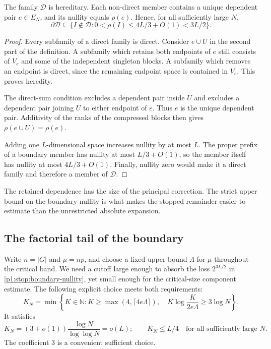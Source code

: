 \begin{lemma}
\label{p1:stop:class}
The family $\mathscr D$ is hereditary.  Each non-direct member
contains a unique dependent pair $e\in E_N$, and its nullity
equals $\rho(e)$.  Hence, for all sufficiently large $N$,
\begin{equation}
 \partial\mathscr D
 \subseteq\{I\notin\mathscr D:
                 0<\rho(I)\le 4L/3+O(1)<3L/2\}.
 \label{p1:stop:boundary-nullity}
\end{equation}
\end{lemma}

\begin{proof}
Every subfamily of a direct family is direct.
Consider $e\cup U$ in the second part of the definition.
A subfamily which retains both endpoints of $e$ still consists
of $V_e$ and some of the independent singleton blocks.  A subfamily
which removes an endpoint is direct, since the remaining endpoint
space is contained in $V_e$.  This proves heredity.

The direct-sum condition excludes a dependent pair inside $U$
and excludes a dependent pair joining $U$ to either endpoint of
$e$.  Thus $e$ is the unique dependent pair.  Additivity of the
ranks of the compressed blocks then gives
$\rho(e\cup U)=\rho(e)$.

Adding one $L$-dimensional space increases nullity by at most
$L$.  The proper prefix of a boundary member has nullity at most
$L/3+O(1)$, so the member itself has nullity at most
$4L/3+O(1)$.  Finally, nullity zero would make it a direct
family and therefore a member of $\mathscr D$.
\end{proof}

The retained dependence has the size of the principal correction.
The strict upper bound on the boundary nullity is what makes
the stopped remainder easier to estimate than the unrestricted
absolute expansion.

\subsection{The factorial tail of the boundary}

Write $n=|G|$ and $\mu=np$, and choose a fixed upper bound
$\Lambda$ for $\mu$ throughout the critical band.  We need a
cutoff large enough to absorb the loss $2^{3L/2}$ in
\eqref{p1:stop:boundary-nullity}, yet small enough for the
critical-size component estimate.  The following explicit
choice meets both requirements:
\begin{equation}
 K_N=\min\left\{K\in\mathbb N:
 K\ge\max(4,\lceil4e\Lambda\rceil),\quad
 K\log\frac{K}{2e\Lambda}\ge3\log N\right\}.
 \label{p1:stop:cutoff}
\end{equation}
It satisfies
\begin{equation}
 K_N=(3+o(1))\frac{\log N}{\log\log N}=o(L);
 \qquad K_N\le L/4
 \quad\text{for all sufficiently large }N.
 \label{p1:stop:cutoff-range}
\end{equation}
The coefficient $3$ is a convenient sufficient choice.

